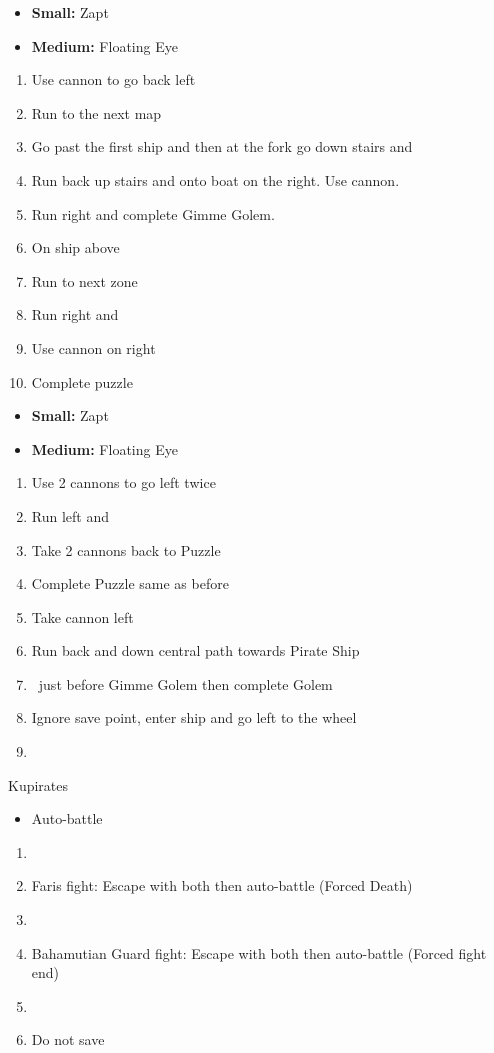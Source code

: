 \begin{puzzle}
	\begin{itemize}
		\item \textbf{Small:} Zapt
		\item \textbf{Medium:} Floating Eye
	\end{itemize}
\end{puzzle}
\begin{enumerate}[resume]
	\item Use cannon to go back left
	\item Run to the next map
	\item Go past the first ship and then at the fork go down stairs and 
	\item Run back up stairs and onto boat on the right. Use cannon.
	\item Run right and complete Gimme Golem.
	\item On ship above 
	\item Run to next zone
	\item Run right and \cs
	\item Use cannon on right
	\item Complete puzzle
\end{enumerate}
\begin{puzzle}
	\begin{itemize}
		\item \textbf{Small:} Zapt
		\item \textbf{Medium:} Floating Eye
	\end{itemize}
\end{puzzle}
\begin{enumerate}[resume]
	\item Use 2 cannons to go left twice
	\item Run left and 
	\item Take 2 cannons back to Puzzle
	\item Complete Puzzle same as before
	\item Take cannon left
	\item Run back and down central path towards Pirate Ship
	\item \cs\ just before Gimme Golem then complete Golem
	\item Ignore save point, enter ship and go left to the wheel
	\item \cs
\end{enumerate}
\begin{battle}[]{Kupirates}
	\begin{itemize}
		\reynnf Thunder
		\lannf Electro Marble
		\item Auto-battle
	\end{itemize}
\end{battle}
\begin{enumerate}[resume]
	\item \cs
	\item Faris fight: Escape with both then auto-battle (Forced Death)
	\item \cs
	\item Bahamutian Guard fight: Escape with both then auto-battle (Forced fight end)
	\item \cs
	\item Do not save
\end{enumerate}